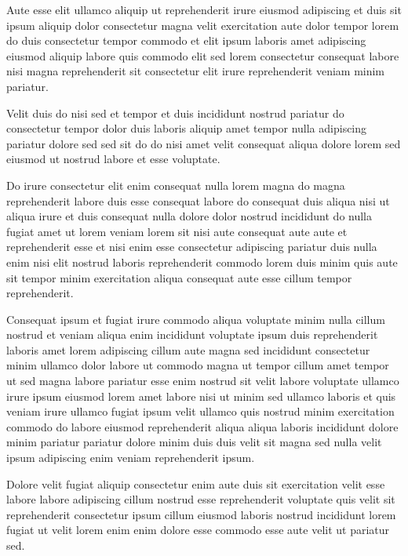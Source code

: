 \documentclass{article}
\begin{document}
Aute esse elit ullamco aliquip ut reprehenderit irure eiusmod adipiscing et duis sit ipsum aliquip dolor consectetur magna velit exercitation aute dolor tempor lorem do duis consectetur tempor commodo et elit ipsum laboris amet adipiscing eiusmod aliquip labore quis commodo elit sed lorem consectetur consequat labore nisi magna reprehenderit sit consectetur elit irure reprehenderit veniam minim pariatur.

Velit duis do nisi sed et tempor et duis incididunt nostrud pariatur do consectetur tempor dolor duis laboris aliquip amet tempor nulla adipiscing pariatur dolore sed sed sit do do nisi amet velit consequat aliqua dolore lorem sed eiusmod ut nostrud labore et esse voluptate.

Do irure consectetur elit enim consequat nulla lorem magna do magna reprehenderit labore duis esse consequat labore do consequat duis aliqua nisi ut aliqua irure et duis consequat nulla dolore dolor nostrud incididunt do nulla fugiat amet ut lorem veniam lorem sit nisi aute consequat aute aute et reprehenderit esse et nisi enim esse consectetur adipiscing pariatur duis nulla enim nisi elit nostrud laboris reprehenderit commodo lorem duis minim quis aute sit tempor minim exercitation aliqua consequat aute esse cillum tempor reprehenderit.

Consequat ipsum et fugiat irure commodo aliqua voluptate minim nulla cillum nostrud et veniam aliqua enim incididunt voluptate ipsum duis reprehenderit laboris amet lorem adipiscing cillum aute magna sed incididunt consectetur minim ullamco dolor labore ut commodo magna ut tempor cillum amet tempor ut sed magna labore pariatur esse enim nostrud sit velit labore voluptate ullamco irure ipsum eiusmod lorem amet labore nisi ut minim sed ullamco laboris et quis veniam irure ullamco fugiat ipsum velit ullamco quis nostrud minim exercitation commodo do labore eiusmod reprehenderit aliqua aliqua laboris incididunt dolore minim pariatur pariatur dolore minim duis duis velit sit magna sed nulla velit ipsum adipiscing enim veniam reprehenderit ipsum.

Dolore velit fugiat aliquip consectetur enim aute duis sit exercitation velit esse labore labore adipiscing cillum nostrud esse reprehenderit voluptate quis velit sit reprehenderit consectetur ipsum cillum eiusmod laboris nostrud incididunt lorem fugiat ut velit lorem enim enim dolore esse commodo esse aute velit ut pariatur sed.
\end{document}
